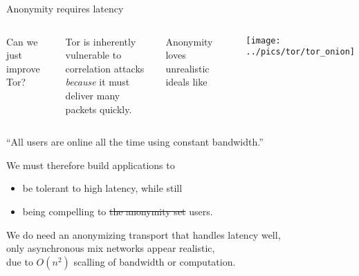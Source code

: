 \documentclass[fleqn,xcolor={usenames,dvipsnames}]{beamer}
\begin{document}
\begin{frame}[t]{Anonymity requires latency}
\begin{columns}[T]
\hspace*{20pt} Can we just improve Tor?

\medskip

\hspace*{5pt} Tor is inherently vulnerable to correlation attacks \\
 \hspace*{10pt} {\em because} it must deliver many packets quickly.

\bigskip 

\hspace*{5pt} Anonymity loves unrealistic ideals like

\texttt{[image: ../pics/tor/tor\_onion]}
\end{columns}
\smallskip
\hspace*{1pt} ``All users are online all the time using constant bandwidth.''

\bigskip
\pause

\noindent We must therefore build applications to
\begin{itemize}
\item be tolerant to high latency, while still
\item being compelling to \sout{the anonymity set} users.
\end{itemize}

\smallskip

We do need an anonymizing transport that handles latency well, \\
\hspace*{2pt} only asynchronous mix networks appear realistic, \\
\hspace*{2pt} due to $O(n^2)$ scalling of bandwidth or computation.

\end{frame}
\end{document}
